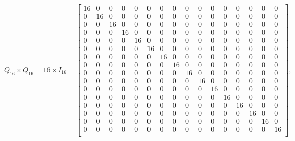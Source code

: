 \documentclass[11pt]{article}
\begin{document}
$$Q_{16} \times Q_{16} = 16 \times I_{16} = 
\left[\begin{smallmatrix}
    16 & 0 & 0 & 0 & 0 & 0 & 0 & 0 & 0 & 0 & 0 & 0 & 0 & 0 & 0 & 0 \\
    0 & 16 & 0 & 0 & 0 & 0 & 0 & 0 & 0 & 0 & 0 & 0 & 0 & 0 & 0 & 0 \\
    0 & 0 & 16 & 0 & 0 & 0 & 0 & 0 & 0 & 0 & 0 & 0 & 0 & 0 & 0 & 0 \\
    0 & 0 & 0 & 16&  0 & 0 & 0 & 0 & 0 & 0 & 0 & 0 & 0 & 0 & 0 & 0 \\
    0 & 0 & 0 & 0 & 16 & 0 & 0 & 0 & 0 & 0 & 0 & 0 & 0 & 0 & 0 & 0 \\
    0 & 0 & 0 & 0 & 0 & 16 & 0 & 0 & 0 & 0 & 0 & 0 & 0 & 0 & 0 & 0 \\
    0 & 0 & 0 & 0 & 0 & 0 & 16 & 0 & 0 & 0 & 0 & 0 & 0 & 0 & 0 & 0 \\
    0 & 0 & 0 & 0 & 0 & 0 & 0 & 16 & 0 & 0 & 0 & 0 & 0 & 0 & 0 & 0 \\
    0 & 0 & 0 & 0 & 0 & 0 & 0 & 0 & 16 & 0 & 0 & 0 & 0 & 0 & 0 & 0 \\
    0 & 0 & 0 & 0 & 0 & 0 & 0 & 0 & 0 & 16 & 0 & 0 & 0 & 0 & 0 & 0 \\
    0 & 0 & 0 & 0 & 0 & 0 & 0 & 0 & 0 & 0 & 16 & 0 & 0 & 0 & 0 & 0 \\
    0 & 0 & 0 & 0 & 0 & 0 & 0 & 0 & 0 & 0 & 0 & 16&  0 & 0 & 0 & 0 \\
    0 & 0 & 0 & 0 & 0 & 0 & 0 & 0 & 0 & 0 & 0 & 0 & 16 & 0 & 0 & 0 \\
    0 & 0 & 0 & 0 & 0 & 0 & 0 & 0 & 0 & 0 & 0 & 0 & 0 & 16 & 0 & 0 \\
    0 & 0 & 0 & 0 & 0 & 0 & 0 & 0 & 0 & 0 & 0 & 0 & 0 & 0 & 16 & 0 \\
    0 & 0 & 0 & 0 & 0 & 0 & 0 & 0 & 0 & 0 & 0 & 0 & 0 & 0 & 0 & 16 \\
\end{smallmatrix}\right],
$$
\end{document}

